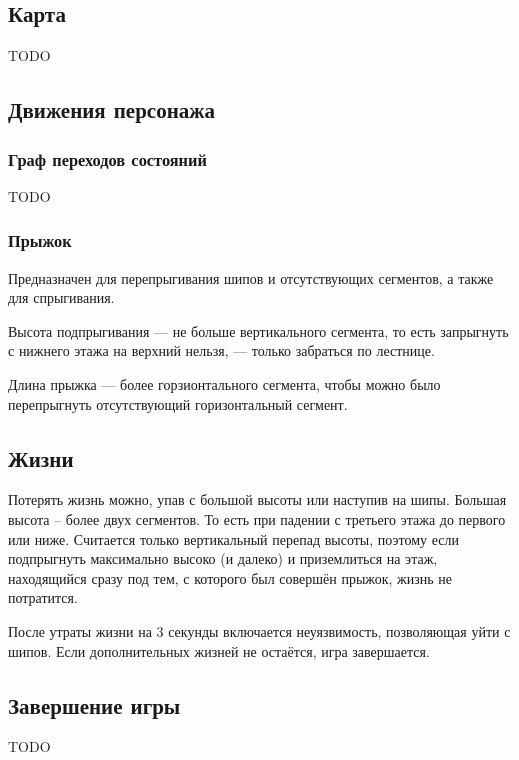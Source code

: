 \documentclass[12pt,a4paper]{article}
\begin{document}
\subsection{Карта}
TODO
\subsection{Движения персонажа}
\subsubsection{Граф переходов состояний}
TODO
\subsubsection{Прыжок}
Предназначен для перепрыгивания шипов и отсутствующих сегментов, а также для спрыгивания.

Высота подпрыгивания --- не больше вертикального сегмента, то есть запрыгнуть с нижнего этажа на верхний нельзя, --- только забраться по лестнице.

Длина прыжка --- более горзионтального сегмента, чтобы можно было перепрыгнуть отсутствующий горизонтальный сегмент.

\subsection{Жизни}
Потерять жизнь можно, упав с большой высоты или наступив на шипы. Большая высота -- более двух сегментов. То есть при падении с третьего этажа до первого или ниже. Считается только вертикальный перепад высоты, поэтому если подпрыгнуть максимально высоко (и далеко) и приземлиться на этаж, находящийся сразу под тем, с которого был совершён прыжок, жизнь не потратится.

После утраты жизни на 3 секунды включается неуязвимость, позволяющая уйти с шипов. Если дополнительных жизней не остаётся, игра завершается.
\subsection{Завершение игры}
TODO
\end{document}
